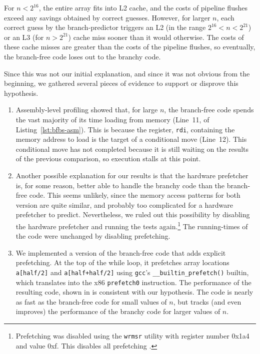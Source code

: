 \documentclass{patmorin}
\newcommand{\lstref}[1]{Listing~\ref{lst:#1}}
\begin{document}
For $n<2^{16}$, the entire array fits into L2 cache, and the costs
of pipeline flushes exceed any savings obtained by correct guesses.
However, for larger $n$, each correct guess by the branch-predictor
triggers an L2 (in the range $2^{16}<n<2^{21}$) or an L3 (for $n>2^{21}$)
cache miss sooner than it would otherwise.  The costs of these cache
misses are greater than the costs of the pipeline flushes, so eventually,
the branch-free code loses out to the branchy code.

Since this was not our initial explanation, and since it was not obvious
from the beginning, we gathered several pieces of evidence to support
or disprove this hypothesis.

\begin{enumerate}
\item Assembly-level profiling showed that, for large $n$, the
  branch-free code spends the vast majority of its time loading from
  memory (Line~11, of \lstref{bfbs-asm}).  This is because the register,
  \texttt{rdi},  containing the memory address to load is the
  target of a conditional move (Line~12).  This conditional move has not
  completed because it is still waiting on the results of the previous
  comparison, so execution stalls at this point.

\item Another possible explanation for our results is that the hardware
   prefetcher is, for some reason, better able to handle the branchy
   code than the branch-free code.  This seems unlikely, since the memory
   access patterns for both version are quite similar, and probably too
   complicated for a hardware prefetcher to predict. Nevertheless, we
   ruled out this possibility by disabling the hardware prefetcher and
   running the tests again.\footnote{Prefetching was disabled using the
   \texttt{wrmsr} utility with register number 0x1a4 and
   value 0xf.  This disables all prefetching \cite{intel:optimizing}.}
   The running-times of the code were unchanged by disabling prefetching.

\item We implemented a version of the branch-free code that adds explicit
   prefetching. At the top of the while loop, it
   prefetches array locations \texttt{a[half/2]}
   and \texttt{a[half+half/2]} using \texttt{gcc}'s
   \texttt{__builtin_prefetch()} builtin, which translates into
   the x86 \texttt{prefetch0} instruction.  The performance of
   the resulting code, shown in  is consistent with our
   hypothesis.  The code is nearly as fast as the branch-free code for
   small values of $n$, but tracks (and even improves) the performance
   of the branchy code for larger values of $n$.


\end{enumerate}
\end{document}

